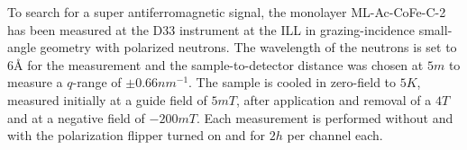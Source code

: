 \documentclass[\main/dresen_thesis.tex]{subfiles}
\begin{document}
      To search for a super antiferromagnetic signal, the monolayer ML-Ac-CoFe-C-2 has been measured at the D33 instrument at the ILL in grazing-incidence small-angle geometry with polarized neutrons.
      The wavelength of the neutrons is set to $6 \unit{\angstrom}$ for the measurement and the sample-to-detector distance was chosen at $5 \unit{m}$ to measure a $q$-range of $\pm 0.66 \unit{nm^{-1}}$.
      The sample is cooled in zero-field to $5 \unit{K}$, measured initially at a guide field of $5 \unit{mT}$, after application and removal of a $4 \unit{T}$ and at a negative field of $-200 \unit{mT}$.
      Each measurement is performed without and with the polarization flipper turned on and for $2 \unit{h}$ per channel each.
\end{document}
